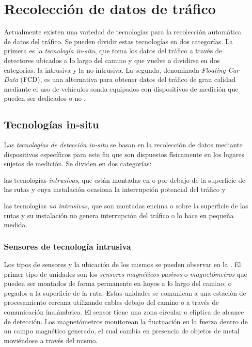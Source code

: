 \chapter{Recolección de datos de tráfico}
\label{cap:3}

Actualmente existen una variedad de tecnologías para la recolección automática de datos del tráfico. Se  pueden dividir estas tecnologías en dos categorías. La primera es la \emph{tecnología in-situ}, que toma los datos del tráfico a través de detectores ubicados a lo largo del camino y que vuelve a dividirse en dos categorías: la intrusiva y la no intrusiva. La segunda, denominada \emph{Floating Car Data} (FCD), es una alternativa para obtener datos del tráfico de gran calidad mediante el uso de vehículos sonda equipados con dispositivos de medición que pueden ser dedicados o no \cite{mimbela2003summary}.

\section{Tecnologías in-situ}

Las \emph{tecnologías de detección in-situ} se basan en la recolección de datos mediante dispositivos específicos para este fin que son dispuestos físicamente en los lugares sujetos de medición. Se dividen en dos categorías: \begin{enumerate*}[a)] \item las tecnologías \emph{intrusivas}, que están montadas en o por debajo de la superficie de las rutas y cuya instalación ocasiona la interrupción potencial del tráfico y \item las tecnologías \emph{no intrusivas}, que son montadas encima o sobre la superficie de las rutas y su instalación no genera interrupción del tráfico o lo hace en pequeña medida.\end{enumerate*}

\subsection{Sensores de tecnología intrusiva}

Los tipos de sensores y la ubicación de los mismos se pueden observar en la . El primer tipo de unidades son los \emph{sensores magnéticos pasivos} o  \emph{magnetómetros} que pueden ser montados de forma permanente en hoyos a lo largo del camino, o pegados a la superficie de la ruta. Estas unidades se comunican a una estación de procesamiento cercana utilizando cables debajo del camino o a través de comunicación inalámbrica. El sensor tiene una zona circular o elíptica de alcance de detección. Los magnetómetros monitorean la fluctuación en la fuerza dentro de un campo magnético generado, el cual cambia en presencia de objetos de metal moviéndose a través del mismo.

